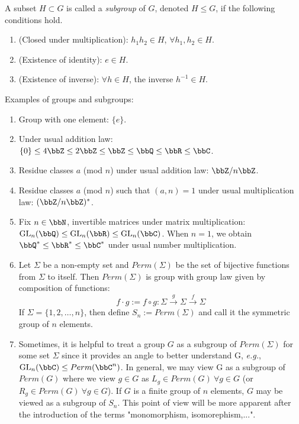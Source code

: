 \begin{definition}
    A subset $H \subset G$ is called a \emph{subgroup} of $G$, denoted $H \leq G$, if the following conditions hold. 
    \begin{enumerate}
        \item (Closed under multiplication): $h_1h_2 \in H$, $\forall h_1,h_2 \in H$.
        \item (Existence of identity): $e \in H$.
        \item (Existence of inverse): $\forall h \in H$, the inverse $h^{-1}\in H$.
    \end{enumerate}
\end{definition}

\begin{example}
    Examples of groups and subgroups:
    \begin{enumerate}
        \item Group with one element: $\{e\}$.
        \item Under usual addition law: $\{0\} \leq 4\bbZ \leq 2\bbZ \leq \bbZ \leq \bbQ \leq \bbR \leq \bbC$.
        \item Residue classes $a$ (mod $n$) under usual addition law: $\bbZ / n\bbZ$.
        \item Residue classes $a$ (mod $n$) such that $(a, n) = 1$ under usual multiplication law:
        $(\bbZ/n\bbZ)^{*}$.
        \item Fix $n \in \bbN$, invertible matrices under matrix multiplication: $\mathrm{GL}_n(\bbQ) \leq \mathrm{GL}_n(\bbR) \leq \mathrm{GL}_n(\bbC) $. When $n=1$, we obtain $\bbQ^* \leq \bbR^* \leq \bbC^*$ under usual number multiplication.
        \item Let $\Sigma$ be a non-empty set and $Perm(\Sigma)$ be the set of bijective functions from $\Sigma$ to itself. Then $Perm(\Sigma)$ is group with group law given by composition of functions:
        $$
        f \cdot g :=f \circ g : \Sigma \stackrel{g}{\rightarrow} \Sigma \stackrel{f}{\rightarrow} \Sigma
        $$
        If $\Sigma = \{1,2,\dots,n\}$, then define $S_n := Perm(\Sigma)$ and call it the symmetric group of $n$ elements.
        \item Sometimes, it is helpful to treat a group $G$ as a subgroup of $Perm(\Sigma)$ for some set $\Sigma$ since it provides an angle to better understand G, \textit{e.g.}, $\mathrm{GL}_n(\bbC)\leq Perm(\bbC^n)$. In general, we may view G as a subgroup of $Perm(G)$ where we view $g \in G$ as $L_g \in Perm(G)~ \forall g \in G$ (or $R_g \in Perm(G)~ \forall g \in G$). If $G$ is a finite group of $n$ elements, $G$ may be viewed as a subgroup of $S_n$. This point of view will be more apparent after the introduction of the terms "monomorphism, isomorephism,...".

    \end{enumerate}
\end{example}

